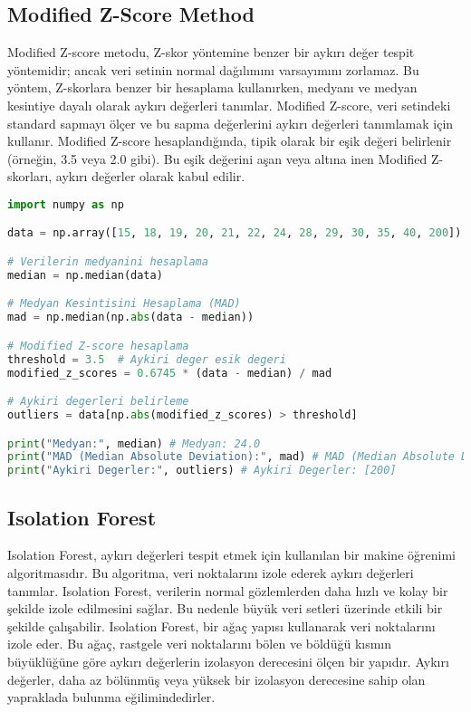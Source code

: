 \subsection{Modified Z-Score Method}
Modified Z-score metodu, Z-skor yöntemine benzer bir aykırı değer tespit yöntemidir; ancak veri setinin normal dağılımını varsayımını zorlamaz. Bu yöntem, Z-skorlara benzer bir hesaplama kullanırken, medyanı ve medyan kesintiye dayalı olarak aykırı değerleri tanımlar. Modified Z-score, veri setindeki standard sapmayı ölçer ve bu sapma değerlerini aykırı değerleri tanımlamak için kullanır. Modified Z-score hesaplandığında, tipik olarak bir eşik değeri belirlenir (örneğin, 3.5 veya 2.0 gibi). Bu eşik değerini aşan veya altına inen Modified Z-skorları, aykırı değerler olarak kabul edilir.

\begin{lstlisting}[language=Python]
import numpy as np

data = np.array([15, 18, 19, 20, 21, 22, 24, 28, 29, 30, 35, 40, 200])

# Verilerin medyanini hesaplama
median = np.median(data)

# Medyan Kesintisini Hesaplama (MAD)
mad = np.median(np.abs(data - median))

# Modified Z-score hesaplama
threshold = 3.5  # Aykiri deger esik degeri
modified_z_scores = 0.6745 * (data - median) / mad

# Aykiri degerleri belirleme
outliers = data[np.abs(modified_z_scores) > threshold]

print("Medyan:", median) # Medyan: 24.0
print("MAD (Median Absolute Deviation):", mad) # MAD (Median Absolute Deviation): 5.0
print("Aykiri Degerler:", outliers) # Aykiri Degerler: [200]
\end{lstlisting}

\subsection{Isolation Forest}
Isolation Forest, aykırı değerleri tespit etmek için kullanılan bir makine öğrenimi algoritmasıdır. Bu algoritma, veri noktalarını izole ederek aykırı değerleri tanımlar. Isolation Forest, verilerin normal gözlemlerden daha hızlı ve kolay bir şekilde izole edilmesini sağlar. Bu nedenle büyük veri setleri üzerinde etkili bir şekilde çalışabilir. Isolation Forest, bir ağaç yapısı kullanarak veri noktalarını izole eder. Bu ağaç, rastgele veri noktalarını bölen ve böldüğü kısmın büyüklüğüne göre aykırı değerlerin izolasyon derecesini ölçen bir yapıdır. Aykırı değerler, daha az bölünmüş veya yüksek bir izolasyon derecesine sahip olan yapraklada bulunma eğilimindedirler.

